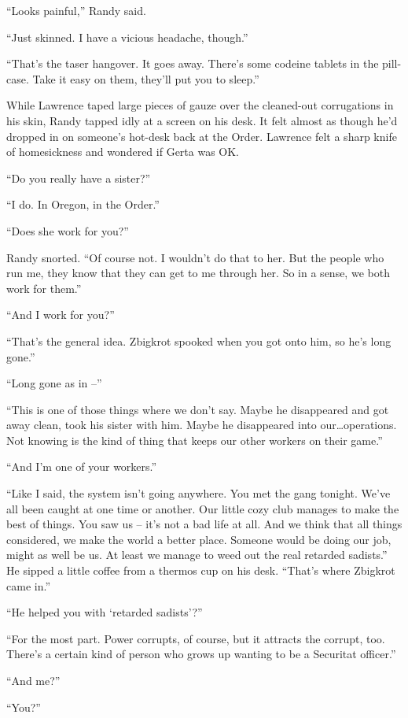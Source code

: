 “Looks painful,” Randy said.

“Just skinned. I have a vicious headache, though.”

“That's the taser hangover. It goes away. There's some codeine 
tablets in the pill-case. Take it easy on them, they'll put you to 
sleep.”

While Lawrence taped large pieces of gauze over the cleaned-out 
corrugations in his skin, Randy tapped idly at a screen on his desk. It 
felt almost as though he'd dropped in on someone's hot-desk back at the 
Order. Lawrence felt a sharp knife of homesickness and wondered if 
Gerta was OK.

“Do you really have a sister?”

“I do. In Oregon, in the Order.”

“Does she work for you?”

Randy snorted. “Of course not. I wouldn't do that to her. But the 
people who run me, they know that they can get to me through her. So in 
a sense, we both work for them.”

“And I work for you?”

“That's the general idea. Zbigkrot spooked when you got onto him, so 
he's long gone.”

“Long gone as in --”

“This is one of those things where we don't say. Maybe he disappeared 
and got away clean, took his sister with him. Maybe he disappeared into 
our\ldots{}operations. Not knowing is the kind of thing that keeps our other 
workers on their game.”

“And I'm one of your workers.”

“Like I said, the system isn't going anywhere. You met the gang 
tonight. We've all been caught at one time or another. Our little cozy 
club manages to make the best of things. You saw us -- it's not a bad 
life at all. And we think that all things considered, we make the world 
a better place. Someone would be doing our job, might as well be us. At 
least we manage to weed out the real retarded sadists.” He sipped a 
little coffee from a thermos cup on his desk. “That's where Zbigkrot 
came in.”

“He helped you with `retarded sadists'?”

“For the most part. Power corrupts, of course, but it attracts the 
corrupt, too. There's a certain kind of person who grows up wanting to 
be a Securitat officer.”

“And me?”

“You?”

